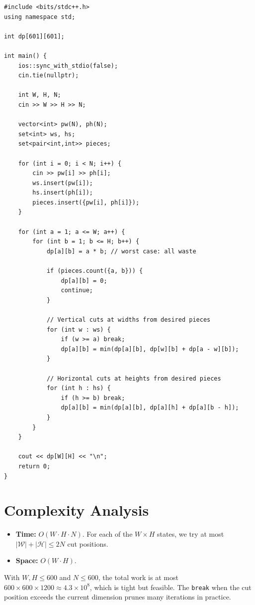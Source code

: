 \documentclass[11pt,a4paper]{article}
\begin{document}
\begin{lstlisting}
#include <bits/stdc++.h>
using namespace std;

int dp[601][601];

int main() {
    ios::sync_with_stdio(false);
    cin.tie(nullptr);

    int W, H, N;
    cin >> W >> H >> N;

    vector<int> pw(N), ph(N);
    set<int> ws, hs;
    set<pair<int,int>> pieces;

    for (int i = 0; i < N; i++) {
        cin >> pw[i] >> ph[i];
        ws.insert(pw[i]);
        hs.insert(ph[i]);
        pieces.insert({pw[i], ph[i]});
    }

    for (int a = 1; a <= W; a++) {
        for (int b = 1; b <= H; b++) {
            dp[a][b] = a * b; // worst case: all waste

            if (pieces.count({a, b})) {
                dp[a][b] = 0;
                continue;
            }

            // Vertical cuts at widths from desired pieces
            for (int w : ws) {
                if (w >= a) break;
                dp[a][b] = min(dp[a][b], dp[w][b] + dp[a - w][b]);
            }

            // Horizontal cuts at heights from desired pieces
            for (int h : hs) {
                if (h >= b) break;
                dp[a][b] = min(dp[a][b], dp[a][h] + dp[a][b - h]);
            }
        }
    }

    cout << dp[W][H] << "\n";
    return 0;
}
\end{lstlisting}

\section{Complexity Analysis}
\begin{itemize}
  \item \textbf{Time:} $O(W \cdot H \cdot N)$. For each of the
        $W \times H$ states, we try at most $|\mathcal{W}| + |\mathcal{H}|
        \le 2N$ cut positions.
  \item \textbf{Space:} $O(W \cdot H)$.
\end{itemize}

With $W, H \le 600$ and $N \le 600$, the total work is at most
$600 \times 600 \times 1200 \approx 4.3 \times 10^8$, which is tight
but feasible. The \texttt{break} when the cut position exceeds the
current dimension prunes many iterations in practice.
\end{document}
